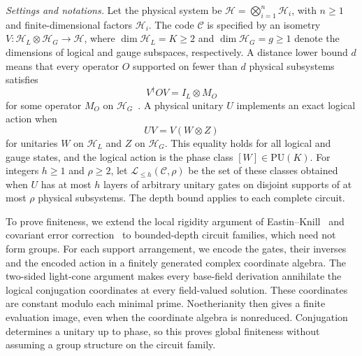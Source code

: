 \documentclass[aps,prl,reprint,notitlepage,nofootinbib,nobibnotes]{revtex4-2}
\newcommand{\HH}{\mathcal H}
\newcommand{\PU}{\mathrm{PU}}
\newcommand{\id}{I}
\begin{document}
 \textit{Settings and notations.} Let the physical system be \(\HH=\bigotimes_{i=1}^{n}\HH_i\), with
\(n\ge1\) and finite-dimensional factors $\HH_i$. The code \(\mathcal C\) is specified
by an isometry \(V:\HH_L\otimes\HH_G\longrightarrow\HH\), where
\(\dim\HH_L=K\ge2\) and \(\dim\HH_G=g\ge1\) denote the dimensions of logical and
gauge subspaces, respectively.
A distance lower bound \(d\) means that every operator \(O\) supported on
fewer than \(d\) physical subsystems satisfies
\begin{equation}\label{eq:correctable}
  V^\dagger O V=\id_L\otimes M_O
\end{equation}
for some operator \(M_O\) on \(\HH_G\)~\cite{KL,Kribs}.
A physical unitary \(U\) implements an exact logical action when
\begin{equation}\label{eq:encoded}
  UV=V(W\otimes Z)
\end{equation}
for unitaries \(W\) on \(\HH_L\) and \(Z\) on \(\HH_G\).
This equality holds for all logical and gauge states, and the logical
action is the phase class \([W]\in\PU(K)\).
For integers \(h\ge1\) and \(\rho\ge2\), let
\(\mathcal L_{\le h}(\mathcal C,\rho)\) be the set of these classes obtained
when \(U\) has at most \(h\) layers of arbitrary unitary gates on disjoint
supports of at most \(\rho\) physical subsystems.
The depth bound applies to each complete circuit.

To prove finiteness, we extend the local rigidity argument of
Eastin--Knill~\cite{EK} and covariant error correction~\cite{Faist,LiuZhou}
to bounded-depth circuit families, which need not form groups.
For each support arrangement, we encode the gates, their inverses and
the encoded action in a finitely generated complex coordinate algebra.
The two-sided light-cone argument makes every base-field derivation
annihilate the logical conjugation coordinates at every field-valued
solution. These coordinates are constant modulo each minimal prime.
Noetherianity then gives a finite evaluation image, even when the
coordinate algebra is nonreduced. Conjugation determines a unitary up
to phase, so this proves global finiteness without assuming a group
structure on the circuit family.
\end{document}
